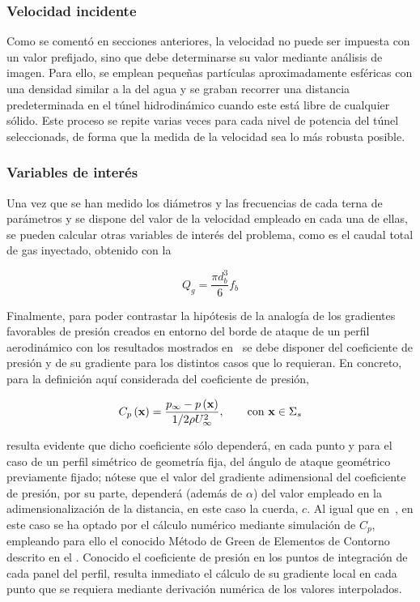 \subsubsection*{Velocidad incidente}

Como se comentó en secciones anteriores, la velocidad no puede ser impuesta con un valor prefijado, sino que debe determinarse su valor mediante análisis de imagen. Para ello, se emplean pequeñas partículas aproximadamente esféricas con una densidad similar a la del agua y se graban recorrer una distancia predeterminada en el túnel hidrodinámico cuando este está libre de cualquier sólido. Este proceso se repite varias veces para cada nivel de potencia del túnel seleccionads, de forma que la medida de la velocidad sea lo más robusta posible. 

\subsubsection*{Variables de interés}

Una vez que se han medido los diámetros y las frecuencias de cada terna de parámetros y se dispone del valor de la velocidad empleado en cada una de ellas, se pueden calcular otras variables de interés del problema, como es el caudal total de gas inyectado, obtenido con la 

\begin{displaymath}
Q_{g}  = \dfrac{\pi d_{b}^{3}}{6}f_{b}
\end{displaymath}

Finalmente, para poder contrastar la hipótesis de la analogía de los gradientes favorables de presión creados en entorno del borde de ataque de un perfil aerodinámico con los resultados mostrados en~\cite{Evangelio2015} se debe disponer del coeficiente de presión y de su gradiente para los distintos casos que lo requieran. En concreto, para la definición aquí considerada del coeficiente de presión,

\begin{equation}
C_{p}\left(\mathbf{x}\right) = \dfrac{p_{\infty} - p\left(\mathbf{x}\right)}{1/2\rho U_{\infty}^{2}},\qquad \mathrm{con} \ \mathbf{x} \in \Sigma_{s}
\LABEQ{cp2D}
\end{equation}

resulta evidente que dicho coeficiente sólo dependerá, en cada punto y  para el caso de un perfil simétrico de geometría fija, del ángulo de ataque geométrico previamente fijado; nótese que el valor del gradiente adimensional del coeficiente de presión, por su parte, dependerá (además de $\alpha$) del  valor empleado en la adimensionalización de la distancia, en este caso la cuerda, $c$. Al igual que en~\cite{Evangelio2015}, en este caso se ha optado por el cálculo numérico mediante simulación de $C_{p}$, empleando para ello el conocido Método de Green de Elementos de Contorno descrito en el . Conocido el coeficiente de presión en los puntos de integración de cada panel del perfil, resulta inmediato el cálculo de su gradiente local en cada punto que se requiera mediante derivación numérica de los valores interpolados. 


